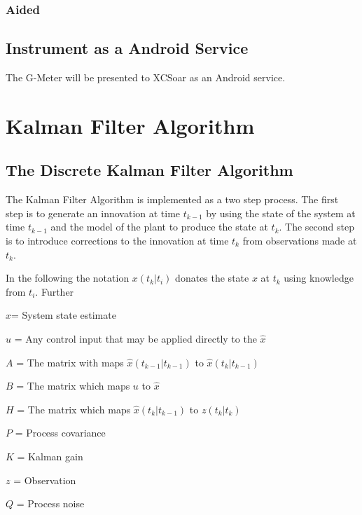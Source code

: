 \documentclass[a4paper]{report}
\numberwithin{equation}{chapter}
\begin{document}
\subsection[Aided]{Aided}

\section[Instrument as a Android Service]{Instrument as a Android Service}

The G-Meter will be presented to XCSoar as an Android service.

\appendix

\clearpage\setcounter{page}{1}
\chapter[Kalman Filter Algorithm]{Kalman Filter Algorithm}

\section[The Discrete Kalman Filter Algorithm]{The Discrete Kalman Filter Algorithm}

The Kalman Filter Algorithm is implemented as a two step process. The first step is to generate an innovation at time $t_{k-1}$ by using the state of the system at time $t_{k - 1}$ and the model of the plant to produce the state at $t_k$. The second step is to introduce corrections to the innovation at time $t_k$ from observations made at $t_k$.

\bigskip

In the following the notation $x \left( t_k|t_i \right)$ donates the state $x$ at $t_k$ using knowledge from $t_i$. Further

$\hat{x}$= System state estimate

$u$ = Any control input that may be applied directly to the $\hat{x}$

$A$ = The matrix with maps $\hat{x} \left( t_{k - 1}|t_{k - 1} \right)$ to $\hat{x} \left( t_k|t_{k - 1} \right)$

$B$ = The matrix which maps $u$ to $\hat{x}$

$H$ = The matrix which maps $\hat{x} \left( t_k|t_{k - 1} \right)$ to $z \left( t_k|t_k \right)$

$P$ = Process covariance

$K$ = Kalman gain

$z$ = Observation

$Q$ = Process noise
\end{document}
